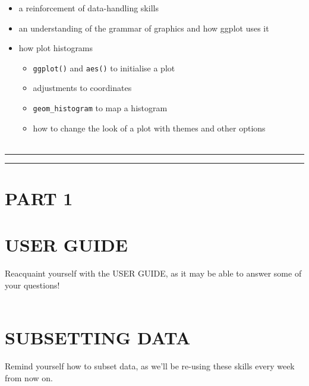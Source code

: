 \documentclass[
]{book}
\providecommand{\tightlist}{%
  \setlength{\itemsep}{0pt}\setlength{\parskip}{0pt}}
\begin{document}
\begin{itemize}
\tightlist
\item
  a reinforcement of data-handling skills
\item
  an understanding of the grammar of graphics and how ggplot uses it
\item
  how plot histograms

  \begin{itemize}
  \tightlist
  \item
    \texttt{ggplot()} and \texttt{aes()} to initialise a plot
  \item
    adjustments to coordinates
  \item
    \texttt{geom\_histogram} to map a histogram
  \item
    how to change the look of a plot with themes and other options\\
    ~\\
  \end{itemize}
\end{itemize}

\begin{center}\rule{0.5\linewidth}{0.5pt}\end{center}

\begin{center}\rule{0.5\linewidth}{0.5pt}\end{center}

\hypertarget{part-1}{%
\section{PART 1}\label{part-1}}

\hypertarget{user-guide}{%
\section{USER GUIDE}\label{user-guide}}

Reacquaint yourself with the USER GUIDE, as it may be able to answer some of
your questions!\\
~\\

\hypertarget{subsetting-data}{%
\section{SUBSETTING DATA}\label{subsetting-data}}

Remind yourself how to subset data, as we'll be re-using these skills every week
from now on.\\
~\\
\end{document}
